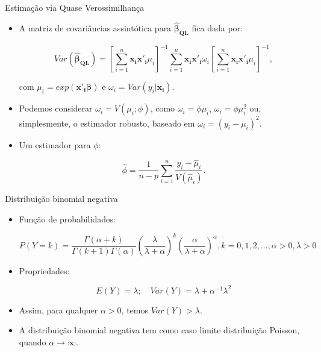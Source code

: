 \documentclass[10pt, aspectratio=169]{beamer}
\begin{document}


\begin{frame}{Estimação via Quase Verossimilhança} 

\begin{itemize}

\item A matriz de covariâncias assintótica para $\boldsymbol{\hat{\beta}_{QL}}$ fica dada por:

$$
Var(\boldsymbol{\hat{\beta}_{QL}})=\left [ \sum_{i=1}^{n} \boldsymbol{x_{i}x'_{i}}\mu_{i} \right ]^{-1}
\sum_{i=1}^{n} \boldsymbol{x_{i}x'_{i}} \omega_{i} \left [ \sum_{i=1}^{n} \boldsymbol{x_{i}x'_{i}}\mu_{i} \right ]^{-1},
$$

com $\mu_{i}=exp({\boldsymbol{x'_{i}\beta}})$ e $\omega_{i}=Var(y_{i}|\boldsymbol{x_{i}})$.

\vspace{0.5cm}


\item Podemos considerar $\omega_i=V(\mu_i;\phi)$, como $\omega_i =\phi \mu_i$, $\omega_i =\phi \mu_i^2$ ou, simplesmente, o estimador robusto, baseado em $\omega_i=(y_i-\mu_i)^2$.

\item Um estimador para $\phi$:

$$ \hat{\phi} = \frac{1}{n-p}\sum_{i=1}^n \frac{y_i-\hat{\mu}_i}{V(\hat{\mu}_i)}. $$


\end{itemize}

\end{frame}





\begin{frame}{Distribuição binomial negativa} 

\begin{itemize}

\item Função de probabilidades:

$$
P(Y=k)=\frac{\Gamma(\alpha+k)}{\Gamma(k+1)\Gamma(\alpha)}\left ( \frac{\lambda}{\lambda+\alpha} \right )^{k} \left( \frac{\alpha}{\lambda+\alpha} \right )^{\alpha}, k=0,1,2,...; \alpha > 0, \lambda>0
$$

\item Propriedades:

$$
E(Y)=\lambda ; \quad Var(Y)= \lambda+ \alpha^{-1} \lambda^2
$$

\item Assim, para qualquer $\alpha>0$, temos $Var(Y)>\lambda$.

\item A distribuição binomial negativa tem como caso limite distribuição Poisson, quando $\alpha \rightarrow \infty$.


\end{itemize}

\end{frame}
\end{document}
